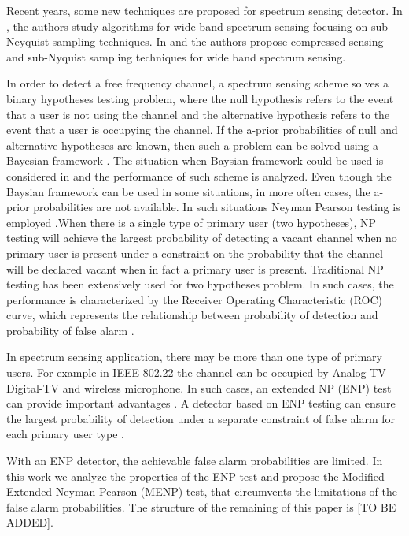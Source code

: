 \documentclass{report}
\begin{document}
\begin{spacing}{2.0}
Recent years, some new techniques are proposed for spectrum sensing detector. 
 In \cite{tian2007compressed}, the authors study algorithms for wide band spectrum sensing focusing on sub-Neyquist sampling techniques. In  \cite{sun2013wideband} and  \cite{sun2013wideband2} the authors propose compressed sensing and sub-Nyquist sampling techniques for wide band spectrum sensing.

In order to detect a free frequency channel, a spectrum sensing scheme solves a binary hypotheses testing problem, where the null hypothesis refers to the event that a user is not using the channel and the alternative hypothesis refers to the event that a user is occupying the channel. If the a-prior probabilities of null and alternative hypotheses are known, then such a problem can be solved using a Bayesian framework \cite{poor1994introduction}. The situation when Baysian framework could be used is considered in \cite{zeng2010review} and the performance of such scheme is analyzed.
Even though the Baysian framework can be used in some situations, in more often cases, the a-prior probabilities are not available. In such situations Neyman Pearson testing is employed \cite{poor1994introduction}.When there is a single type of primary user (two hypotheses), NP testing will achieve the largest probability of detecting a vacant channel when no primary user is present under a constraint on the probability that the channel will be declared vacant when in fact a primary user is present.
Traditional NP testing has been extensively used for two hypotheses problem. In such cases,  the performance is characterized by the Receiver Operating Characteristic (ROC) curve, which represents the relationship between probability of detection and probability of false alarm \cite{poor1994introduction}. 

In spectrum sensing application, there may be more than one type of primary users. For example in IEEE 802.22 \cite{shellhammer2008spectrum} the channel can be occupied by Analog-TV Digital-TV and wireless microphone. In such cases, an extended NP (ENP) test can provide important advantages \cite{zhang1999design}. A detector based on ENP testing can ensure the largest probability of detection under a separate constraint of false alarm for each primary user type \cite{LehmannTest}.

With an ENP detector, the achievable false alarm probabilities are limited. In this work we analyze the properties of the ENP test and propose the Modified Extended Neyman Pearson (MENP) test, that circumvents the limitations of the false alarm probabilities. The structure of the remaining of this paper is [TO BE ADDED].

\newpage
\end{spacing}
\end{document}
